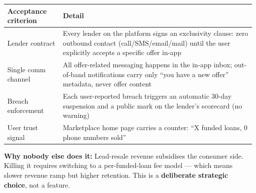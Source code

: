 \documentclass[
  10pt,
]{article}
\begin{document}
\begin{longtable}[]{@{}ll@{}}
\toprule
\begin{minipage}[b]{0.47\columnwidth}\raggedright
Acceptance criterion\strut
\end{minipage} & \begin{minipage}[b]{0.47\columnwidth}\raggedright
Detail\strut
\end{minipage}\tabularnewline
\midrule
\endhead
\begin{minipage}[t]{0.47\columnwidth}\raggedright
Lender contract\strut
\end{minipage} & \begin{minipage}[t]{0.47\columnwidth}\raggedright
Every lender on the platform signs an exclusivity clause: zero outbound contact
(call/SMS/email/mail) until the user explicitly accepts a specific offer in-app\strut
\end{minipage}\tabularnewline
\begin{minipage}[t]{0.47\columnwidth}\raggedright
Single comm channel\strut
\end{minipage} & \begin{minipage}[t]{0.47\columnwidth}\raggedright
All offer-related messaging happens in the in-app inbox; out-of-band notifications carry only ``you
have a new offer'' metadata, never offer content\strut
\end{minipage}\tabularnewline
\begin{minipage}[t]{0.47\columnwidth}\raggedright
Breach enforcement\strut
\end{minipage} & \begin{minipage}[t]{0.47\columnwidth}\raggedright
Each user-reported breach triggers an automatic 30-day suspension and a public mark on the lender's
scorecard (no warning)\strut
\end{minipage}\tabularnewline
\begin{minipage}[t]{0.47\columnwidth}\raggedright
User trust signal\strut
\end{minipage} & \begin{minipage}[t]{0.47\columnwidth}\raggedright
Marketplace home page carries a counter: ``X funded loans, 0 phone numbers sold''\strut
\end{minipage}\tabularnewline
\bottomrule
\end{longtable}

\textbf{Why nobody else does it:} Lead-resale revenue subsidises the consumer side. Killing it
requires switching to a per-funded-loan fee model --- which means slower revenue ramp but higher
retention. This is a \textbf{deliberate strategic choice}, not a feature.
\end{document}
